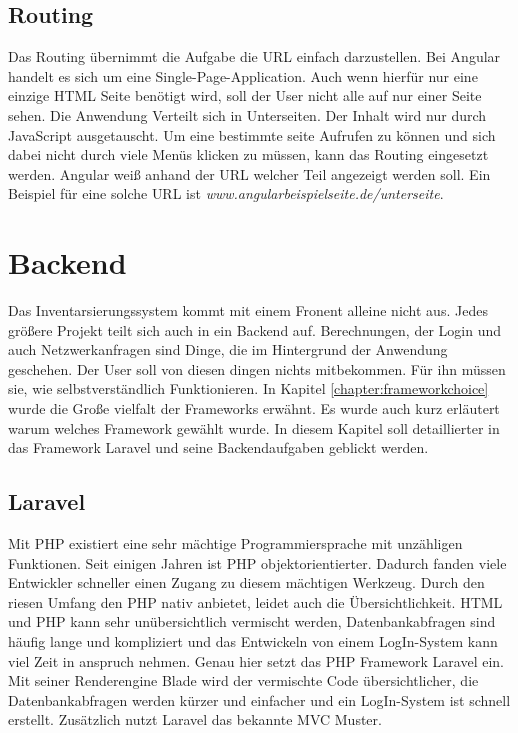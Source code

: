 \subsection{Routing}
Das Routing übernimmt die Aufgabe die \ac{URL} einfach darzustellen. Bei Angular handelt es sich um eine Single-Page-Application. Auch wenn hierfür nur eine einzige \ac{HTML} Seite benötigt wird, soll der User nicht alle auf nur einer Seite sehen. Die Anwendung Verteilt sich in Unterseiten. Der Inhalt wird nur durch JavaScript ausgetauscht. Um eine bestimmte seite Aufrufen zu können und sich dabei nicht durch viele Menüs klicken zu müssen, kann das Routing eingesetzt werden. Angular weiß anhand der \ac{URL} welcher Teil angezeigt werden soll.\autocite{Clow.2018} Ein Beispiel für eine solche \ac{URL} ist \textit{www.angularbeispielseite.de/unterseite}.



\section{Backend}
Das Inventarsierungssystem kommt mit einem Fronent alleine nicht aus. Jedes größere Projekt teilt sich auch in ein Backend auf. Berechnungen, der Login und auch Netzwerkanfragen sind Dinge, die im Hintergrund der Anwendung geschehen. Der User soll von diesen dingen nichts mitbekommen. Für ihn müssen sie, wie selbstverständlich Funktionieren. In Kapitel \ref{chapter:frameworkchoice} wurde die Große vielfalt der Frameworks erwähnt. Es wurde auch kurz erläutert warum welches Framework gewählt wurde. In diesem Kapitel soll detaillierter in das Framework Laravel und seine Backendaufgaben geblickt werden.

\subsection{Laravel}
Mit \ac{PHP} existiert eine sehr mächtige Programmiersprache mit unzähligen Funktionen. Seit einigen Jahren ist \ac{PHP} objektorientierter. Dadurch fanden viele Entwickler schneller einen Zugang zu diesem mächtigen Werkzeug. Durch den riesen Umfang den \ac{PHP} nativ anbietet, leidet auch die Übersichtlichkeit. \ac{HTML} und \ac{PHP} kann sehr unübersichtlich vermischt werden, Datenbankabfragen sind häufig lange und kompliziert und das Entwickeln von einem LogIn-System kann viel Zeit in anspruch nehmen. Genau hier setzt das \ac{PHP} Framework Laravel ein. Mit seiner Renderengine Blade wird der vermischte Code übersichtlicher, die Datenbankabfragen werden kürzer und einfacher und ein LogIn-System ist schnell erstellt. Zusätzlich nutzt Laravel das bekannte \ac{MVC} Muster.\autocite{Laravel.2018}

